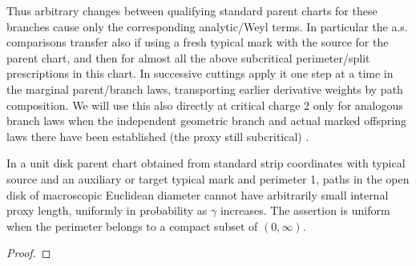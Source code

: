 Thus arbitrary changes between qualifying standard parent charts for these branches cause only the corresponding analytic/Weyl terms.
In particular the a.s. comparisons transfer also if using a fresh typical mark with the source for the parent chart, and then for almost all the above subcritical perimeter/split prescriptions in this chart.
In successive cuttings apply it one step at a time in the marginal parent/branch laws, transporting earlier derivative weights by path composition.
We will use this also directly at critical charge 2 only for analogous branch laws when the independent geometric branch and actual marked offspring laws there have been established (the proxy still subcritical) \citep[Theorem~1.1]{Devlin}.

\begin{lemma}\label{proxy:lower-cost}

In a unit disk parent chart obtained from standard strip coordinates with typical source and an auxiliary or target typical mark and perimeter 1, paths in the open disk of macroscopic Euclidean diameter cannot have arbitrarily small internal proxy length, uniformly in probability as \(\gamma\) increases.
The assertion is uniform when the perimeter belongs to a compact subset of $(0,\infty)$. 

\end{lemma}\begin{proof}


\end{proof}
